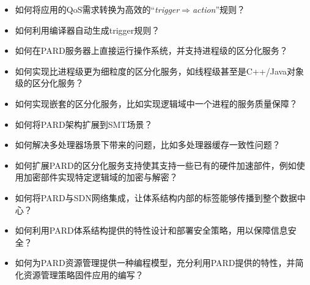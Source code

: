 \begin{itemize}[nolistsep]
  \item 如何将应用的QoS需求转换为高效的``\emph{trigger$\Rightarrow$action}''规则？
  \item 如何利用编译器自动生成trigger规则？
  \item 如何在PARD服务器上直接运行操作系统，并支持进程级的区分化服务？
  \item 如何实现比进程级更为细粒度的区分化服务，如线程级甚至是C++/Java对象级的区分化服务？
  \item 如何实现嵌套的区分化服务，比如实现逻辑域中一个进程的服务质量保障？
  \item 如何将PARD架构扩展到SMT场景？
  \item 如何解决多处理器场景下带来的问题，比如多处理器缓存一致性问题？
  \item 如何扩展PARD的区分化服务支持使其支持一些已有的硬件加速部件，例如使用加密部件实现特定逻辑域的加密与解密？
  \item 如何将PARD与SDN网络集成，让体系结构内部的标签能够传播到整个数据中心？
  \item 如何利用PARD体系结构提供的特性设计和部署安全策略，用以保障信息安全？
  \item 如何为PARD资源管理提供一种编程模型，充分利用PARD提供的特性，并简化资源管理策略固件应用的编写？
\end{itemize}


